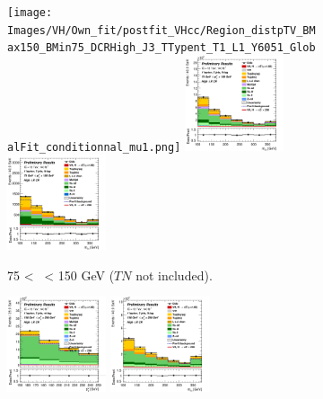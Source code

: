 \vspace*{\fill} \newpage
\vspace*{\fill} 

\begin{figure}[h!]
    \centering
    \begin{subfigure}[b]{\textwidth}
        \centering
        \texttt{[image: Images/VH/Own\_fit/postfit\_VHcc/Region\_distpTV\_BMax150\_BMin75\_DCRHigh\_J3\_TTypent\_T1\_L1\_Y6051\_GlobalFit\_conditionnal\_mu1.png]}
        \includegraphics[width=0.32\textwidth]{Images/VH/Own_fit/postfit_VHcc/Region_distmBB_BMax150_BMin75_DCRHigh_J3_TTypelt_T2_L1_Y6051_GlobalFit_conditionnal_mu1.png}
        \includegraphics[width=0.32\textwidth]{Images/VH/Own_fit/postfit_VHcc/Region_distmBB_BMax150_BMin75_DCRHigh_J3_TTypett_T2_L1_Y6051_GlobalFit_conditionnal_mu1.png}
        \caption{75 < \ptv\ < 150 GeV ($TN$ not included).}
        \label{fig:plots_VHcc_1L_75_CRH_3J}
    \end{subfigure}
    \begin{subfigure}[b]{\textwidth}
        \centering
        \includegraphics[width=0.32\textwidth]{Images/VH/Own_fit/postfit_VHcc/Region_distpTV_BMax250_BMin150_DCRHigh_J3_TTypent_T1_L1_Y6051_GlobalFit_conditionnal_mu1.png}
        \includegraphics[width=0.32\textwidth]{Images/VH/Own_fit/postfit_VHcc/Region_distmBB_BMax250_BMin150_DCRHigh_J3_TTypelt_T2_L1_Y6051_GlobalFit_conditionnal_mu1.png}

\end{subfigure}
\end{figure}
